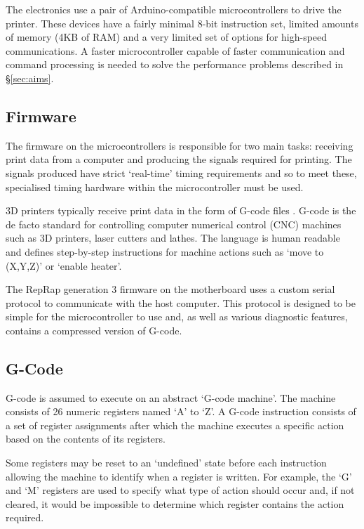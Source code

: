 			The electronics use a pair of Arduino-compatible microcontrollers to drive
			the printer. These devices have a fairly minimal 8-bit instruction set,
			limited amounts of memory (4KB of RAM) and a very limited set of options
			for high-speed communications. A faster microcontroller capable of faster
			communication and command processing is needed to solve the performance
			problems described in \S\ref{sec:aims}.
		
		\subsection{Firmware}
			
			The firmware on the microcontrollers is responsible for two main tasks:
			receiving print data from a computer and producing the signals required
			for printing. The signals produced have strict `real-time' timing
			requirements and so to meet these, specialised timing hardware within the
			microcontroller must be used.
			
			3D printers typically receive print data in the form of G-code files
			\cite{reprapgcode}. G-code is the de facto standard for controlling
			computer numerical control (CNC) machines such as 3D printers, laser
			cutters and lathes. The language is human readable and defines
			step-by-step instructions for machine actions such as `move to (X,Y,Z)' or
			`enable heater'.
			
			The RepRap generation 3 firmware on the motherboard uses a custom serial
			protocol to communicate with the host computer. This protocol is designed
			to be simple for the microcontroller to use and, as well as various
			diagnostic features, contains a compressed version of G-code.
			
		\subsection{G-Code}
			
			\label{sec:gcodemachine}
			
			G-code is assumed to execute on an abstract `G-code machine'. The machine
			consists of 26 numeric registers named `A' to `Z'.  A G-code instruction
			consists of a set of register assignments after which the machine
			executes a specific action based on the contents of its registers.
			
			Some registers may be reset to an `undefined' state before each
			instruction allowing the machine to identify when a register is written.
			For example, the `G' and `M' registers are used to specify what type of
			action should occur and, if not cleared, it would be impossible
			to determine which register contains the action required.
			
